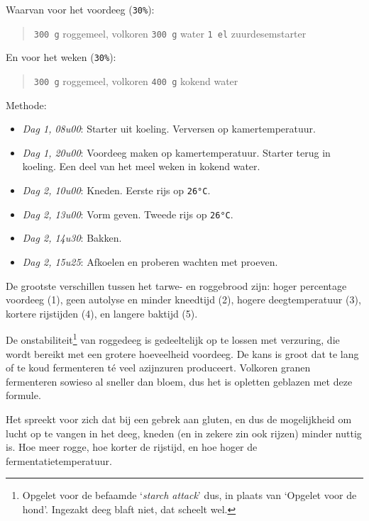 \documentclass[
  11pt,
  dutch,
]{memoir}
\providecommand{\tightlist}{%
  \setlength{\itemsep}{0pt}\setlength{\parskip}{0pt}}
\begin{document}
Waarvan voor het voordeeg (\texttt{30\%}):

\begin{quote}
\texttt{300\ g} roggemeel, volkoren \newline \texttt{300\ g} water
\newline \texttt{1\ el} zuurdesemstarter
\end{quote}

En voor het weken (\texttt{30\%}):

\begin{quote}
\texttt{300\ g} roggemeel, volkoren \newline \texttt{400\ g} kokend
water
\end{quote}

Methode:

\begin{itemize}
\tightlist
\item
  \emph{Dag 1, 08u00}: Starter uit koeling. Verversen op
  kamertemperatuur.
\item
  \emph{Dag 1, 20u00}: Voordeeg maken op kamertemperatuur. Starter terug
  in koeling. Een deel van het meel weken in kokend water.
\item
  \emph{Dag 2, 10u00}: Kneden. Eerste rijs op \texttt{26°C}.
\item
  \emph{Dag 2, 13u00}: Vorm geven. Tweede rijs op \texttt{26°C}.
\item
  \emph{Dag 2, 14u30}: Bakken.
\item
  \emph{Dag 2, 15u25}: Afkoelen en proberen wachten met proeven.
\end{itemize}

De grootste verschillen tussen het tarwe- en roggebrood zijn: hoger
percentage voordeeg (1), geen autolyse en minder kneedtijd (2), hogere
deegtemperatuur (3), kortere rijstijden (4), en langere baktijd (5).

De onstabiliteit\footnote{Opgelet voor de befaamde `\emph{starch
  attack}' dus, in plaats van `Opgelet voor de hond'. Ingezakt deeg
  blaft niet, dat scheelt wel.} van roggedeeg is gedeeltelijk op te
lossen met verzuring, die wordt bereikt met een grotere hoeveelheid
voordeeg. De kans is groot dat te lang of te koud fermenteren té veel
azijnzuren produceert. Volkoren granen fermenteren sowieso al sneller
dan bloem, dus het is opletten geblazen met deze formule.

Het spreekt voor zich dat bij een gebrek aan gluten, en dus de
mogelijkheid om lucht op te vangen in het deeg, kneden (en in zekere zin
ook rijzen) minder nuttig is. Hoe meer rogge, hoe korter de rijstijd, en
hoe hoger de fermentatietemperatuur.
\end{document}
